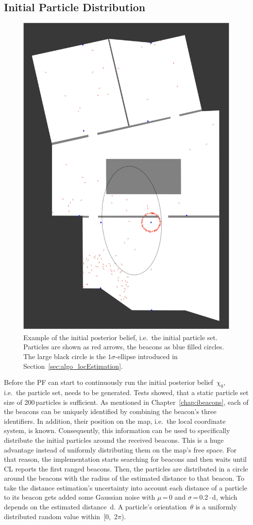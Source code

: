 \subsection{Initial Particle Distribution}\label{sec:algo_initial}

\begin{figure}
\includegraphics[height=0.7\textwidth]{figures/algo_particle_generation}
\caption{Example of the initial posterior belief, i.e.\ the initial particle set. Particles are shown as red arrows, the beacons as blue filled circles. The large black circle is the $1\sigma$-ellipse introduced in Section~\ref{sec:algo_locEstimation}.}
\label{fig:pf_initialDist}
\end{figure}

Before the \ac{PF} can start to continuously run the initial posterior belief~$\chi_0$, i.e.\ the particle set, needs to be generated. Tests showed, that a static particle set size of 200\,particles is sufficient. As mentioned in Chapter~\ref{chap:ibeacons}, each of the beacons can be uniquely identified by combining the beacon's three identifiers. In addition, their position on the map, i.e.\ the local coordinate system, is known. Consequently, this information can be used to specifically distribute the initial particles around the received beacons. This is a huge advantage instead of uniformly distributing them on the map's free space. For that reason, the implementation starts searching for beacons and then waits until \ac{CL} reports the first ranged beacons. Then, the particles are distributed in a circle around the beacons with the radius of the estimated distance to that beacon. To take the distance estimation's uncertainty into account each distance of a particle to its beacon gets added some Gaussian noise with $\mu$\,=\,0 and $\sigma$\,=\,0.2\,$\cdot$\,d, which depends on the estimated distance~d. A particle's orientation~$\theta$ is a uniformly distributed random value within~[0,~2$\pi$).

